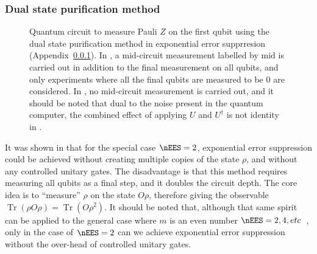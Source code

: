 \subsubsection{Dual state purification method}
\label{sec:derangement-details_dual-state-pure}

\begin{figure}[ht]
    \centering
    \caption{Quantum circuit to measure Pauli $Z$ on the first qubit using the dual state purification method in exponential error supprresion (Appendix~\ref{sec:derangement-details_dual-state-pure}). 
    In \protect{}, a mid-circuit measurement labelled by $\mathrm{mid}$ is carried out in addition to the final
    measurement on all qubits, and only experiments where all the final qubits are measured to be $0$ are considered.
    In \protect{}, no mid-circuit
    measurement is carried out, and it should be noted that dual to the noise present in the quantum computer, the combined effect of applying $U$ and $U^\dagger$ is not identity in \protect{}.
    }
    \label{fig:dual-state-purification}
\end{figure}

It was shown in \citet{huoDualstatePurificationPractical2021} that for the special case $\nEES=2$, exponential error suppression could be achieved without creating multiple copies of the state $\rho$, and without any controlled unitary gates. The disadvantage is that this method requires measuring all qubits as a final step, and it doubles the circuit depth. The core idea is to ``measure'' $\rho$ on the state $O\rho$, therefore giving the observable $\operatorname{Tr}(\rho O\rho) = \operatorname{Tr}(O\rho^2)$.
It should be noted that, although that same spirit can be applied to the general case where $m$ is an even number $\nEES=2, 4, etc$~\cite{cai2021resourceefficient}, only in the case of $\nEES=2$ can we achieve exponential error suppression without the over-head of controlled unitary gates.

